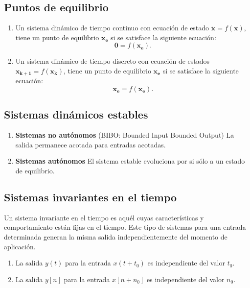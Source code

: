 \subsection{Puntos de equilibrio}
\begin{enumerate}
	\item Un sistema dinámico de tiempo continuo con ecuación de estado $\mathbf{\dot x} = f(\mathbf{x})$, tiene un punto de equilibrio $\mathbf{x_{e}}$ si se satisface la siguiente ecuación:
	\begin{equation}
		\mathbf{0} = f(\mathbf{x_{e}}).
	\end{equation}
	
	\item Un sistema dinámico de tiempo discreto con ecuación de estados $\mathbf{x_{k+1}} = f(\mathbf{x_{k}})$, tiene un punto de equilibrio $\mathbf{x_{e}}$ si se satisface la siguiente ecuación:
	\begin{equation}
		\mathbf{x_{e}} = f(\mathbf{x_{e}}).
	\end{equation}
\end{enumerate}

\subsection{Sistemas dinámicos estables}
\begin{enumerate}
	\item \textbf{Sistemas no autónomos} (BIBO: Bounded Input Bounded Output) La salida permanece acotada para entradas acotadas.
	\item \textbf{Sistemas autónomos} El sistema estable evoluciona por si sólo a un estado de equilibrio.
\end{enumerate}

\subsection{Sistemas invariantes en el tiempo}
Un sistema invariante en el tiempo es aquél cuyas características y comportamiento están fijas en el tiempo. Este tipo de sistemas para una entrada determinada generan la misma salida independientemente del momento de aplicación.
\begin{enumerate}
	\item La salida $y(t)$ para la entrada $x(t+t_{0})$ es independiente del valor $t_{0}$.
	\item La salida $y[n]$ para la entrada $x[n + n_{0}]$ es independiente del valor $n_{0}$.
\end{enumerate}

